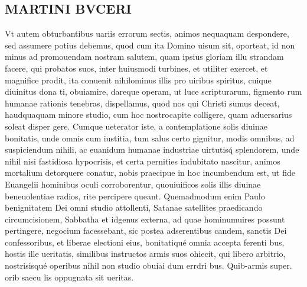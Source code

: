 \documentclass{article}
\begin{document}
\begin{pages}
\section*{MARTINI BVCERI }\pstart Vt autem obturbantibus   uariis errorum sectis, animos nequaquam despondere, sed assumere potius debemus, quod cum ita Domino uisum sit, oporteat, id non minus ad promouendam nostram salutem, quam ipsius gloriam illu strandam facere, qui probatos suos, inter huiusmodi turbines, et utiliter exercet, et magnifice prodit, ita conuenit nihilominus illis pro uiribus spiritus, cuique diuinitus dona ti, obuiamire, dareque operam, ut luce scripturarum, figmento rum humanae rationis tenebras, dispellamus, quod nos qui Christi sumus deceat, haudquaquam minore studio, cum hoc nostrocapite colligere, quam aduersarius soleat disper gere. Cumque ueterator iste, a contemplatione solis diuinae bonitatis, unde omnis cum iustitia, tum salus certo gignitur, modis omnibus, ad suspiciendum nihili, ac euanidum humanae industriae uirtutisq́ splendorem, unde nihil nisi fastidiosa hypocrisis, et certa pernities indubitato nascitur, animos mortalium detorquere conatur, nobis praecipue in hoc incumbendum est, ut fide Euangelii hominibus oculi corroborentur, quouiuificos solis illis diuinae beneuolentiae radios, rite percipere queant.  \pend\pstart Quemadmodum enim Paulo benignitatem Dei omni studio attollenti, Satanae satellites praedicando circumcisionem, Sabbatha et idgenus externa, ad quae hominumuires possunt pertingere, negocium facessebant, sic postea adserentibus candem, sanctis Dei confessoribus, et liberae electioni eius, bonitatiqué omnia accepta ferenti bus, hostis ille ueritatis, similibus instructos armis suos ohiecit, qui libero arbitrio, nostrisisqué operibus nihil non  \pendQuo studio obuiai dum errdri bus. Quib-armis super. orib saecu lis oppugnata sit ueritas. 

\end{pages}
\end{document}
